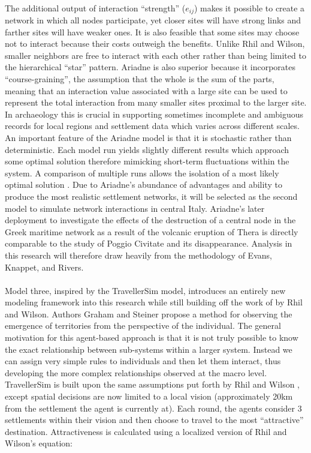 \documentclass[12pt,a4paper]{thesis}
\begin{document}
\paragraph{}
The additional output of interaction ``strength'' ($e_{ij}$) makes it possible to create a network in which all nodes participate, yet closer sites will have strong links and farther sites will have weaker ones. It is also feasible that some sites may choose not to interact because their costs outweigh the benefits. Unlike Rhil and Wilson, smaller neighbors are free to interact with each other rather than being limited to the hierarchical ``star'' pattern. Ariadne is also superior because it incorporates ``course-graining'', the assumption that the whole is the sum of the parts, meaning that an interaction value associated with a large site can be used to represent the total interaction from many smaller sites proximal to the larger site. In archaeology this is crucial in supporting sometimes incomplete and ambiguous records for local regions and settlement data which varies across different scales. An important feature of the Ariadne model is that it is stochastic rather than deterministic. Each model run yields slightly different results which approach some optimal solution therefore mimicking short-term fluctuations within the system. A comparison of multiple runs allows the isolation of a most likely optimal solution \citep[12]{ERK12}. Due to Ariadne's abundance of advantages and ability to produce the most realistic settlement networks, it will be selected as the second model to simulate network interactions in central Italy. Ariadne's later deployment to investigate the effects of the destruction of a central node in the Greek maritime network as a result of the volcanic eruption of Thera \citep{KnaRivEva11} is directly comparable to the study of Poggio Civitate and its disappearance. Analysis in this research will therefore draw heavily from the methodology of Evans, Knappet, and Rivers.
	
\paragraph{}
Model three, inspired by the TravellerSim model\footnotemark, introduces an entirely new modeling framework into this research while still building off the work of by Rhil and Wilson. Authors Graham and Steiner \citeyearpar{GraSte08} propose a method for observing the emergence of territories from the perspective of the individual. The general motivation for this agent-based approach is that it is not truly possible to know the exact relationship between sub-systems within a larger system. Instead we can assign very simple rules to individuals and then let them interact, thus developing the more complex relationships observed at the macro level. TravellerSim is built upon the same assumptions put forth by Rhil and Wilson \citep[64, 71]{RihWil91}, except spatial decisions are now limited to a local vision (approximately 20km from the settlement the agent is currently at). Each round, the agents consider 3 settlements within their vision and then choose to travel to the most ``attractive'' destination. Attractiveness is calculated using a localized version of Rhil and Wilson's equation:
\end{document}
